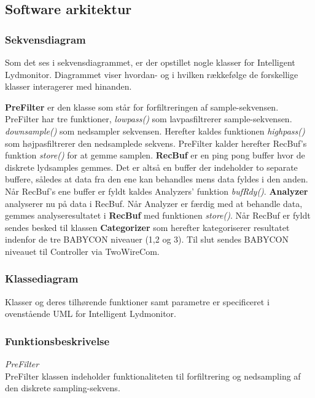 \newpage
\subsection{Software arkitektur}
\subsubsection*{Sekvensdiagram}

Som det ses i sekvensdiagrammet, er der opstillet nogle klasser for Intelligent Lydmonitor. Diagrammet viser hvordan- og i hvilken rækkefølge de forskellige klasser interagerer med hinanden. 

\textbf{PreFilter} er den klasse som står for forfiltreringen af sample-sekvensen. PreFilter har tre funktioner, \textit{lowpass()} som lavpasfiltrerer sample-sekvensen. \textit{downsample()} som nedsampler sekvensen. Herefter kaldes funktionen \textit{highpass()} som højpasfiltrerer den nedsamplede sekvens. PreFilter kalder herefter RecBuf's funktion \textit{store()} for at gemme samplen.
\textbf{RecBuf} er en ping pong buffer hvor de diskrete lydsamples gemmes. Det er altså en buffer der indeholder to separate buffere, således at data fra den ene kan behandles mens data fyldes i den anden. Når RecBuf's ene buffer er fyldt kaldes Analyzers' funktion \textit{bufRdy()}. \textbf{Analyzer} analyserer nu på data i RecBuf. Når Analyzer er færdig med at behandle data, gemmes analyseresultatet i \textbf{RecBuf} med funktionen \textit{store()}. Når RecBuf er fyldt sendes besked til klassen \textbf{Categorizer} som herefter kategoriserer resultatet indenfor de tre BABYCON niveauer (1,2 og 3). 
Til slut sendes BABYCON niveauet til Controller via TwoWireCom. 

\subsubsection*{Klassediagram}
Klasser og deres tilhørende funktioner samt parametre er specificeret i ovenstående UML for Intelligent Lydmonitor. 

\subsubsection*{Funktionsbeskrivelse}

\textit{PreFilter} \\
PreFilter klassen indeholder funktionaliteten til forfiltrering og nedsampling af den diskrete sampling-sekvens.



